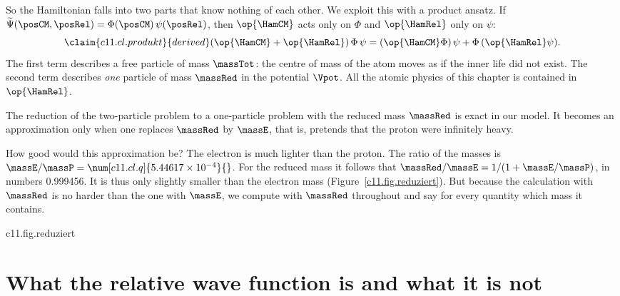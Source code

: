 So the Hamiltonian falls into two parts that know nothing of each other. We exploit this
with a product ansatz. If $\widetilde{\Psi}(\posCM, \posRel) =
\Phi(\posCM)\,\psi(\posRel)$, then $\op{\HamCM}$ acts only on $\Phi$ and $\op{\HamRel}$ only on
$\psi$:
\begin{equation}\label{c11.eq.produkt}\claim{c11.cl.produkt}{derived}
  (\op{\HamCM} + \op{\HamRel})\,\Phi\,\psi
  = (\op{\HamCM}\Phi)\,\psi + \Phi\,(\op{\HamRel}\psi).
\end{equation}
The first term describes a free particle of mass $\massTot$: the centre of mass of the
atom moves as if the inner life did not exist. The second term describes \emph{one}
particle of mass $\massRed$ in the potential $\Vpot$. All the atomic physics of this
chapter is contained in $\op{\HamRel}$.

\begin{merksatz}
  The reduction of the two-particle problem to a one-particle problem with the reduced
  mass $\massRed$ is exact in our model. It becomes an approximation only when one
  replaces $\massRed$ by $\massE$, that is, pretends that the proton were infinitely
  heavy.
\end{merksatz}

How good would this approximation be? The electron is much lighter than the proton. The
ratio of the masses is $\massE/\massP = \num[c11.cl.q]{5.44617 \times 10^{-4}}{}$. For
the reduced mass it follows that $\massRed/\massE = 1/(1 + \massE/\massP)$, in numbers
\num[c11.cl.mu-ratio]{0.999456}{}. It is thus only slightly smaller than the electron
mass (Figure~\ref{c11.fig.reduziert}). But because the
calculation with $\massRed$ is no harder than the one with $\massE$, we compute with
$\massRed$ throughout and say for every quantity which mass it contains.

\begin{tpcfigure}{c11.fig.reduziert}
  \caption{The reduced mass of , in units of the electron mass, as a function of the mass ratio; the horizontal axis is logarithmic. For equal masses $\massRed$ is half of $\massE$. The heavier the second particle, the closer $\massRed$ comes to the electron mass; the right-hand point is hydrogen.}
\end{tpcfigure}

\section{What the relative wave function is and what it is not}\label{c11.s3}

